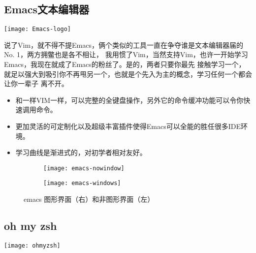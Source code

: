 \documentclass[11pt,fleqn]{book} %
\begin{document}
\subsection{Emacs文本编辑器}

\begin{center}
\texttt{[image: Emacs-logo]}
\end{center}

说了Vim，就不得不提Emacs，俩个类似的工具一直在争夺谁是文本编辑器届的No. 1，两方拥鳖也是各不相让，
我用惯了Vim，当然支持Vim，也许一开始学习Emacs，我现在就成了Emacs的粉丝了。是的，两者只要你最先
接触学习一个，就足以强大到吸引你不再甩另一个，也就是个先入为主的概念，学习任何一个都会让你一辈子
离不开。

\begin{itemize}
\item 和一样VIM一样，可以完整的全键盘操作，另外它的命令缓冲功能可以令你快速调用命令。
\item 更加灵活的可定制化以及超级丰富插件使得Emacs可以全能的胜任很多IDE环境。　
\item 学习曲线是渐进式的，对初学者相对友好。
\end{itemize}

\begin{figure}[!h]

  \noindent
  \begin{subfigure}{0.5\textwidth}
    \texttt{[image: emacs-nowindow]}
  \end{subfigure}
  \begin{subfigure}{0.5\textwidth}
    \texttt{[image: emacs-windows]}
  \end{subfigure}

  \caption{emacs 图形界面（右）和非图形界面（左）}
\end{figure}

\subsection{oh my zsh}

\begin{center}
\texttt{[image: ohmyzsh]}
\end{center}
\end{document}
